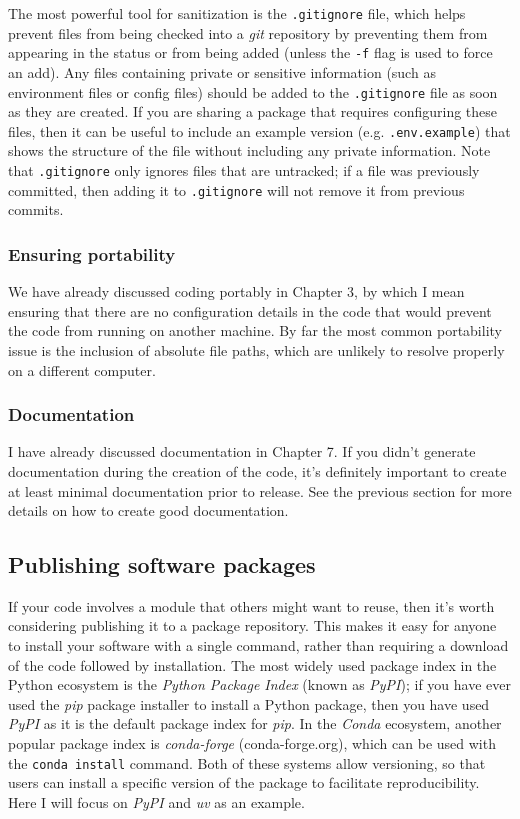 The most powerful tool for sanitization is the \texttt{.gitignore} file, which helps prevent files from being checked into a \textit{git} repository by preventing them from appearing in the status or from being added (unless the \texttt{-f} flag is used to force an add).  Any files containing private or sensitive information (such as environment files or config files) should be added to the \texttt{.gitignore} file as soon as they are created.  If you are sharing a package that requires configuring these files, then it can be useful to include an example version (e.g. \texttt{.env.example}) that shows the structure of the file without including any private information.  Note that \texttt{.gitignore} only ignores files that are untracked; if a file was previously committed, then adding it to \texttt{.gitignore} will not remove it from previous commits.

\subsubsection{Ensuring portability}

We have already discussed coding portably in Chapter 3, by which I mean ensuring that there are no configuration details in the code that would prevent the code from running on another machine. By far the most common portability issue is the inclusion of absolute file paths, which are unlikely to resolve properly on a different computer.

\subsubsection{Documentation}

I have already discussed documentation in Chapter 7.  If you didn't generate documentation during the creation of the code, it's definitely important to create at least minimal documentation prior to release.  See the previous section for more details on how to create good documentation.

\subsection{Publishing software packages}

If your code involves a module that others might want to reuse, then it's worth considering publishing it to a package repository. This makes it easy for anyone to install your software with a single command, rather than requiring a download of the code followed by installation.  The most widely used package index in the Python ecosystem is the \textit{Python Package Index} (known as \textit{PyPI}); if you have ever used the \textit{pip} package installer to install a Python package, then you have used \textit{PyPI} as it is the default package index for \textit{pip}.  In the \textit{Conda} ecosystem, another popular package index is \textit{conda-forge} (conda-forge.org), which can be used with the \texttt{conda install} command. Both of these systems allow versioning, so that users can install a specific version of the package to facilitate reproducibility.  Here I will focus on \textit{PyPI} and \textit{uv} as an example.

